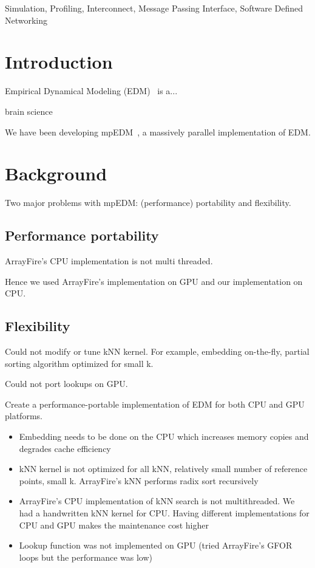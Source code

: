 \documentclass[conference]{IEEEtran}
\begin{document}
\begin{IEEEkeywords}
    Simulation, Profiling, Interconnect, Message Passing Interface, Software
    Defined Networking
\end{IEEEkeywords}

\section{Introduction}

Empirical Dynamical Modeling (EDM)~\cite{Chang2017} is a...

\cite{Ma2017}

brain science~\cite{Natsukawa2017}

We have been developing mpEDM~\cite{mpedm}, a massively parallel
implementation of EDM.

\section{Background}

Two major problems with mpEDM: (performance) portability and flexibility.

\subsection{Performance portability}

ArrayFire's CPU implementation is not multi threaded.

Hence we used ArrayFire's implementation on GPU and our implementation on CPU.

\subsection{Flexibility}

Could not modify or tune kNN kernel. For example, embedding on-the-fly,
partial sorting algorithm optimized for small k.

Could not port lookups on GPU.

Create a performance-portable implementation of EDM for both CPU and GPU
platforms.

\begin{itemize}
\item Embedding needs to be done on the CPU which increases memory copies and degrades cache efficiency
\item kNN kernel is not optimized for all kNN, relatively small number of
    reference points, small k. ArrayFire’s kNN performs radix sort recursively
\item ArrayFire’s CPU implementation of kNN search is not multithreaded. We
    had a handwritten kNN kernel for CPU. Having different implementations for
    CPU and GPU makes the maintenance cost higher
\item Lookup function was not implemented on GPU (tried ArrayFire’s GFOR loops
    but the performance was low)
\end{itemize}
\end{document}
